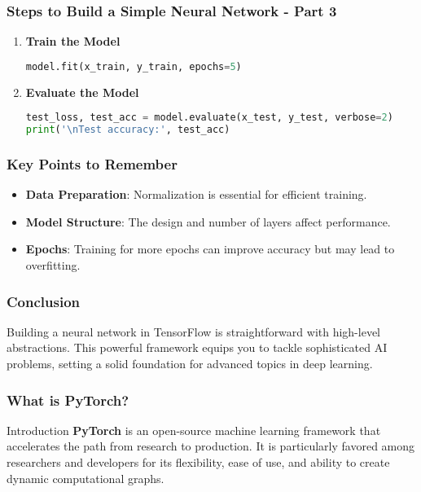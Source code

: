 \documentclass[aspectratio=169]{beamer}
\begin{document}
\begin{frame}[fragile]
    \frametitle{Steps to Build a Simple Neural Network - Part 3}
    \begin{enumerate}[resume]
        \item \textbf{Train the Model}
            \begin{lstlisting}[language=Python]
model.fit(x_train, y_train, epochs=5)
            \end{lstlisting}
        \item \textbf{Evaluate the Model}
            \begin{lstlisting}[language=Python]
test_loss, test_acc = model.evaluate(x_test, y_test, verbose=2)
print('\nTest accuracy:', test_acc)
            \end{lstlisting}
    \end{enumerate}
\end{frame}

\begin{frame}
    \frametitle{Key Points to Remember}
    \begin{itemize}
        \item \textbf{Data Preparation}:
        Normalization is essential for efficient training.
        
        \item \textbf{Model Structure}:
        The design and number of layers affect performance.
        
        \item \textbf{Epochs}:
        Training for more epochs can improve accuracy but may lead to overfitting.
    \end{itemize}
\end{frame}

\begin{frame}
    \frametitle{Conclusion}
    Building a neural network in TensorFlow is straightforward with high-level abstractions. This powerful framework equips you to tackle sophisticated AI problems, setting a solid foundation for advanced topics in deep learning.
\end{frame}

\begin{frame}[fragile]
    \frametitle{What is PyTorch?}
    \begin{block}{Introduction}
        \textbf{PyTorch} is an open-source machine learning framework that accelerates the path from research to production. It is particularly favored among researchers and developers for its flexibility, ease of use, and ability to create dynamic computational graphs.
    \end{block}
\end{frame}
\end{document}
